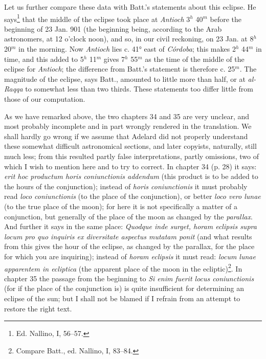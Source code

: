 \documentclass[11pt]{article}
\newcommand{\Pg}[1]{\marginpar{\footnotesize\color{gray}#1}}
\begin{document}
\par \Pg{96}Let us further compare these data with Batt.'s statements about this eclipse. He says\footnote{Ed. Nallino, I, 56–57.} that the middle of the eclipse took place at \emph{Antioch} 3$^{h}$ 40$^{m}$ before the beginning of 23 Jan. 901 (the beginning being, according to the Arab astronomers, at 12 o'clock noon), and so, in our civil reckoning, on 23 Jan. at 8$^{h}$ 20$^{m}$ in the morning. Now \emph{Antioch} lies c. 41° east of \emph{Córdoba}; this makes 2$^{h}$ 44$^{m}$ in time, and this added to 5$^{h}$ 11$^{m}$ gives 7$^{h}$ 55$^{m}$ as the time of the middle of the eclipse for \emph{Antioch}; the difference from Batt.'s statement is therefore c. 25$^{m}$. The magnitude of the eclipse, says Batt., amounted to little more than half, or at \emph{al-Raqqa} to somewhat less than two thirds. These statements too differ little from those of our computation.\par
\par As we have remarked above, the two chapters 34 and 35 are very unclear, and most probably incomplete and in part wrongly rendered in the translation. We shall hardly go wrong if we assume that Adelard did not properly understand these somewhat difficult astronomical sections, and later copyists, naturally, still much less; from this resulted partly false interpretations, partly omissions, two of which I wish to mention here and to try to correct. In chapter 34 (p. 28) it says: \emph{erit hoc productum horis coniunctionis addendum} (this product is to be added to the hours of the conjunction); instead of \emph{horis coniunctionis} it must probably read \emph{loco coniunctionis} (to the place of the conjunction), or better \emph{loco vero lunae} (to the true place of the moon); for here it is not specifically a matter of a conjunction, but generally of the place of the moon as changed by the \emph{parallax}. And further it says in the same place: \emph{Quodque inde surget, horam eclipsis supra locum pro quo inquiris ex diversitate aspectus mutatam ponit} (and what results from this gives the hour of the eclipse, as changed by the parallax, for the place for which you are inquiring); instead of \emph{horam eclipsis} it must read: \emph{locum lunae apparentem in ecliptica} (the apparent place of the moon in the ecliptic)\footnote{Compare Batt., ed. Nallino, I, 83–84.}. In chapter 35 the passage from the beginning to \emph{Si enim fuerit locus coniunctionis} (for if the place of the conjunction is) is quite insufficient for determining an eclipse of the sun; but I shall not be blamed if I refrain from an attempt to restore the right text.\par
\end{document}
